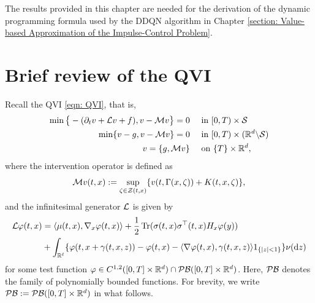 \label{appendix: Auxiliary Results for Dynamic Programming}
The results provided in this chapter are needed for the derivation of the dynamic programming formula used by the DDQN algorithm in Chapter \ref{section: Value-based Approximation of the Impulse-Control Problem}. %

\section{Brief review of the QVI}
\label{appendix: Brief review of the QVI}
Recall the QVI \eqref{eqn: QVI}, that is, 
\begin{align}
    \min\big\{ - (\partial_t v + \mathcal{L} v + f), v - \mathcal{M} v \big\} = 0& \quad \text{ in } [0,T) \times \mathcal{S} \label{eqn: QVI RL I Appendix} \\
    \min \{v - g, v - \mathcal{M} v \} = 0 & \quad \text{ in } [0,T) \times (\mathbb{R}^d \backslash \mathcal{S}) \label{eqn: QVI RL II Appendix} \\
    v = \{g, \mathcal{M} v\} & \quad \text{ on } \{T\} \times \mathbb{R}^d \label{eqn: QVI RL III Appendix},
\end{align}
where the intervention operator is defined as
\begin{equation*}
    \mathcal{M} v(t,x) := \sup_{\zeta \in \mathcal{Z}(t,x)} \{v(t,\Gamma(x,\zeta)) + K(t,x,\zeta)\},
\end{equation*}
and the infinitesimal generator $\mathcal{L}$ is given by
\begin{align}
    \mathcal{L} \varphi(t,x) &= \langle \mu(t,x), \nabla_x \varphi(t,x) \rangle + \frac{1}{2} \operatorname{Tr} (\sigma(t,x)\sigma^\top(t,x)H_x \varphi(y)) \nonumber\\
    &+ \int_{\mathbb{R}^\ell} \{\varphi(t,x+\gamma(t,x,z)) - \varphi(t,x) - \langle \nabla \varphi(t,x), \gamma(t,x,z) \rangle 1_{\left\{|z|<1\right\}}\} \nu(\mathrm{d} z)
    \label{C: infinitesimal generator}
\end{align}
for some test function $\varphi \in C^{1,2}([0,T]\times \mathbb{R}^d) \cap \mathcal{PB}([0,T]\times \mathbb{R}^d)$. Here, $\mathcal{PB}$ denotes the family of polynomially bounded functions. For brevity, we write $\mathcal{PB}:=\mathcal{PB}([0,T]\times \mathbb{R}^d)$ in what follows. 

